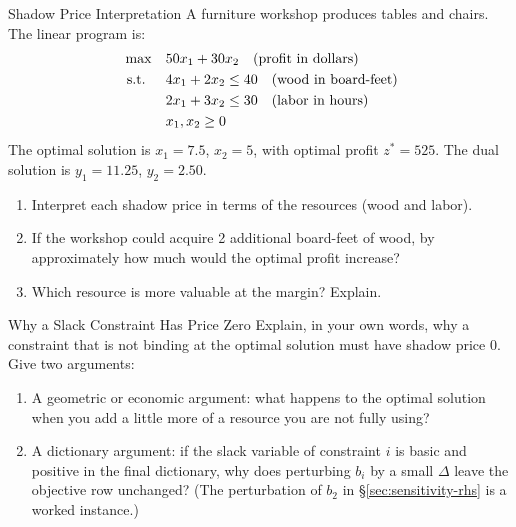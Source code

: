 
\begin{ex}{Shadow Price Interpretation}{}
\label{ex:shadow-price-workshop}
 A furniture workshop produces tables and chairs. The linear program is:
\[
\begin{aligned}
\max \quad & 50x_1 + 30x_2 \quad \text{(profit in dollars)}\\
\text{ s.t. } \quad
& 4x_1 + 2x_2 \leq 40 \quad \text{(wood in board-feet)} \\
& 2x_1 + 3x_2 \leq 30 \quad \text{(labor in hours)} \\
& x_1, x_2 \geq 0
\end{aligned}
\]
The optimal solution is $x_1 = 7.5$, $x_2 = 5$, with optimal profit $z^* = 525$.  The dual solution is $y_1 = 11.25$, $y_2 = 2.50$.

\begin{enumerate}
\item Interpret each shadow price in terms of the resources (wood and labor).
\item If the workshop could acquire 2 additional board-feet of wood, by approximately how much would the optimal profit increase?
\item Which resource is more valuable at the margin? Explain.
\end{enumerate}
\exrefs{\S\ref{sec:sensitivity-rhs}}
\end{ex}

\begin{ex}{Why a Slack Constraint Has Price Zero}{}
 Explain, in your own words, why a constraint that is not binding at the optimal solution must have shadow price $0$. Give two arguments:
\begin{enumerate}
\item A geometric or economic argument: what happens to the optimal solution when you add a little more of a resource you are not fully using?
\item A dictionary argument: if the slack variable of constraint $i$ is basic and positive in the final dictionary, why does perturbing $b_i$ by a small $\Delta$ leave the objective row unchanged? (The perturbation of $b_2$ in \S\ref{sec:sensitivity-rhs} is a worked instance.)
\end{enumerate}
\exrefs{\S\ref{sec:sensitivity-rhs}, \S\ref{sec:sensitivity-overview}}
\end{ex}

